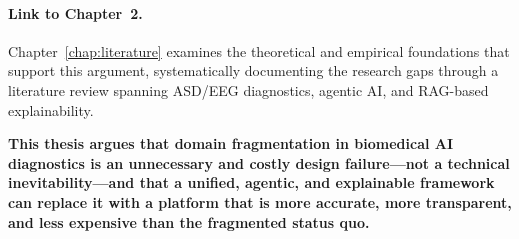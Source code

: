 \label{tab:ch1_kit_objectives}

\paragraph{Link to Chapter~2.}
Chapter~\ref{chap:literature} examines the theoretical and empirical foundations that support this argument, systematically documenting the research gaps through a literature review spanning ASD/EEG diagnostics, agentic AI, and RAG-based explainability.

\textbf{This thesis argues that domain fragmentation in biomedical AI diagnostics is an unnecessary and costly design failure---not a technical inevitability---and that a unified, agentic, and explainable framework can replace it with a platform that is more accurate, more transparent, and less expensive than the fragmented status quo.}
